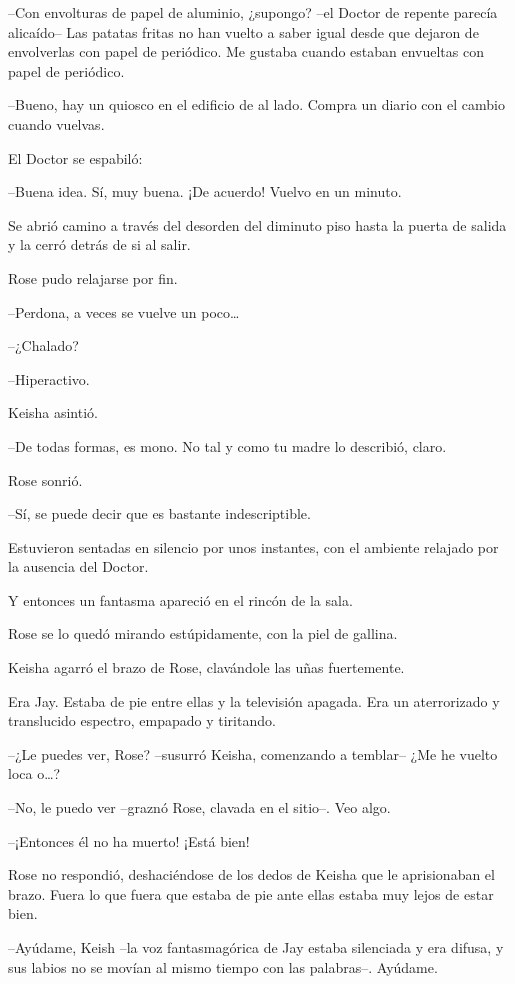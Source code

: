 {--Con envolturas de papel de aluminio, ¿supongo? --el Doctor de repente
 parecía alicaído-- Las patatas fritas no han vuelto a saber igual desde
 que dejaron de envolverlas con papel de periódico. Me gustaba cuando
estaban envueltas con papel de periódico.}

{--Bueno, hay un quiosco en el edificio de al lado. Compra un diario con
el cambio cuando vuelvas.}

{El Doctor se espabiló:}

{--Buena idea. Sí, muy buena. ¡De acuerdo! Vuelvo en un minuto.}

{Se abrió camino a través del desorden del diminuto piso hasta la puerta
de salida y la cerró detrás de si al salir.}

{Rose pudo relajarse por fin.}

{--Perdona, a veces se vuelve un poco\ldots{}}

{--¿Chalado?}

{--Hiperactivo.}

{Keisha asintió.}

{--De todas formas, es mono. No tal y como tu madre lo describió,
claro.}

{Rose sonrió.}

{--Sí, se puede decir que es bastante indescriptible.}

{Estuvieron sentadas en silencio por unos instantes, con el ambiente
relajado por la ausencia del Doctor.}

{Y entonces un fantasma apareció en el rincón de la sala.}

{Rose se lo quedó mirando estúpidamente, con la piel de gallina.}

{Keisha agarró el brazo de Rose, clavándole las uñas fuertemente.}

{Era Jay. Estaba de pie entre ellas y la televisión apagada. Era un
aterrorizado y translucido espectro, empapado y tiritando. }

{--¿Le puedes ver, Rose? --susurró Keisha, comenzando a temblar-- ¿Me he
 vuelto loca o\ldots{}?}

{--No, le puedo ver --graznó Rose, clavada en el sitio--. Veo algo.}

{--¡Entonces él no ha muerto! ¡Está bien!}

{Rose no respondió, deshaciéndose de los dedos de Keisha que le
 aprisionaban el brazo. Fuera lo que fuera que estaba de pie ante ellas
estaba muy lejos de estar bien.}

{--Ayúdame, Keish --la voz fantasmagórica de Jay estaba silenciada y era
 difusa, y sus labios no se movían al mismo tiempo con las palabras--.
Ayúdame.}

